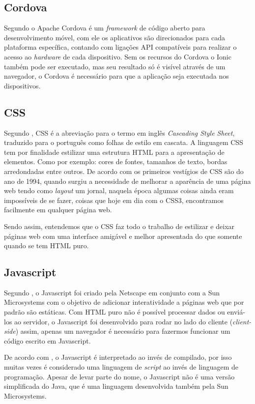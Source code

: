 	\subsection{Cordova}
		\par Segundo  o Apache Cordova é um \textit{framework} de código aberto para desenvolvimento móvel, com ele os aplicativos são direcionados para cada plataforma específica, contando com ligações API compatíveis para realizar o acesso ao \textit{hardware} de cada dispositivo. Sem os recursos do Cordova o Ionic também pode ser executado, mas seu resultado só é visível através de um navegador, o Cordova é necessário para que a aplicação seja executada nos dispositivos.
	\subsection{CSS}
		\par Segundo , CSS é a abreviação para o termo em inglês \textit{Cascading Style Sheet}, traduzido para o
		português como folhas de estilo em cascata. A linguagem CSS tem por finalidade estilizar uma estrutura HTML para a apresentação de elementos. Como por exemplo: cores de fontes, tamanhos de texto, bordas arredondadas entre outros. De acordo com  os primeiros vestígios de CSS são do ano de 1994, quando surgiu a necessidade de melhorar a aparência de uma página web tendo como \textit{layout} um jornal, naquela época algumas coisas ainda eram impossíveis de se fazer, coisas que hoje em dia com o CSS3, encontramos facilmente em qualquer página web.
		\par Sendo assim, entendemos que o CSS faz todo o trabalho de estilizar e deixar páginas web com uma interface amigável e melhor apresentada do que somente quando se tem HTML puro.
		
	\subsection{Javascript}
		\par Segundo , o Javascript foi criado pela Netscape em conjunto com a Sun Microsystems com o objetivo de adicionar interatividade a páginas web que por padrão são estáticas. Com HTML puro não é possível processar dados ou enviá-los ao servidor, o Javascript foi desenvolvido para rodar no lado do cliente (\textit{client-side}) assim, apenas um navegador é necessário para fazermos funcionar um código escrito em Javascript.
		\par De acordo com , o Javascript é interpretado ao invés de compilado, por isso muitas vezes é considerado uma linguagem de \textit{script} ao invés de linguagem de programação. Apesar de levar parte do nome, o Javascript não é uma versão simplificada do Java, que é uma linguagem desenvolvida também pela Sun Microsystems.
		
